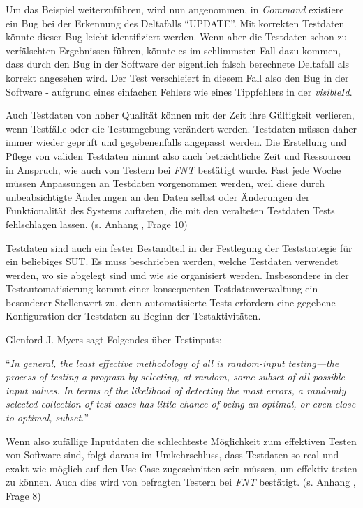 Um das Beispiel weiterzuführen, wird nun angenommen, in \textit{Command} existiere ein Bug bei der Erkennung des Deltafalls \enquote{UPDATE}. Mit korrekten Testdaten könnte dieser Bug leicht identifiziert werden. Wenn aber die Testdaten schon zu verfälschten Ergebnissen führen, könnte es im schlimmsten Fall dazu kommen, dass durch den Bug in der Software der eigentlich falsch berechnete Deltafall als korrekt angesehen wird. Der Test verschleiert in diesem Fall also den Bug in der Software - aufgrund eines einfachen Fehlers wie eines Tippfehlers in der \textit{visibleId}.

Auch Testdaten von hoher Qualität können mit der Zeit ihre Gültigkeit verlieren, wenn Testfälle oder die Testumgebung verändert werden. Testdaten müssen daher immer wieder geprüft und gegebenenfalls angepasst werden. \cite[S. 121f.]{witte:2019} Die Erstellung und Pflege von validen Testdaten nimmt also auch beträchtliche Zeit und Ressourcen in Anspruch, wie auch von Testern bei \textit{FNT} bestätigt wurde. Fast jede Woche müssen Anpassungen an Testdaten vorgenommen werden, weil diese durch unbeabsichtigte Änderungen an den Daten selbst oder Änderungen der Funktionalität des Systems auftreten, die mit den veralteten Testdaten Tests fehlschlagen lassen. (s. Anhang , Frage 10)

Testdaten sind auch ein fester Bestandteil in der Festlegung der Teststrategie für ein beliebiges \ac{SUT}. Es muss beschrieben werden, welche Testdaten verwendet werden, wo sie abgelegt sind und wie sie organisiert werden. \cite[S. 119]{witte:2019} Insbesondere in der Testautomatisierung kommt einer konsequenten Testdatenverwaltung ein besonderer Stellenwert zu, denn automatisierte Tests erfordern eine gegebene Konfiguration der Testdaten zu Beginn der Testaktivitäten. \cite[S. 236]{witte:2019}

Glenford J. Myers sagt Folgendes über Testinputs:

\enquote{\textit{In general, the least effective methodology of all is random-input
testing—the process of testing a program by selecting, at random, some
subset of all possible input values. In terms of the likelihood of detecting
the most errors, a randomly selected collection of test cases has little
chance of being an optimal, or even close to optimal, subset.}} \cite[S. 41]{myers:2011}

Wenn also zufällige Inputdaten die schlechteste Möglichkeit zum effektiven Testen von Software sind, folgt daraus im Umkehrschluss, dass Testdaten so real und exakt wie möglich auf den Use-Case zugeschnitten sein müssen, um effektiv testen zu können. Auch dies wird von befragten Testern bei \textit{FNT} bestätigt. (s. Anhang , Frage 8)

